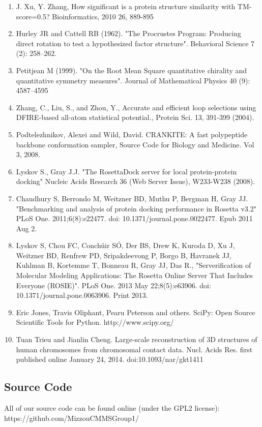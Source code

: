 \documentclass{article}
\begin{document}
\begin{enumerate}
\item J. Xu, Y. Zhang, How significant is a protein structure similarity with TM-score=0.5? Bioinformatics, 2010 26, 889-895

\item Hurley JR and Cattell RB (1962). "The Procrustes Program: Producing direct rotation to test a hypothesized factor structure". Behavioral Science 7 (2): 258–262.

\item Petitjean M (1999). "On the Root Mean Square quantitative chirality and quantitative symmetry measures". Journal of Mathematical Physics 40 (9): 4587–4595

\item Zhang, C., Liu, S., and Zhou, Y., Accurate and efficient loop selections using DFIRE-based all-atom statistical potential., Protein Sci. 13, 391-399 (2004).

\item Podtelezhnikov, Alexei and Wild, David.  CRANKITE: A fast polypeptide backbone conformation sampler, Source Code for Biology and Medicine.  Vol 3, 2008.

\item Lyskov S., Gray J.J. "The RosettaDock server for local protein-protein docking" Nucleic Acids Research 36 (Web Server Issue), W233-W238 (2008).

\item Chaudhury S, Berrondo M, Weitzner BD, Muthu P, Bergman H, Gray JJ. "Benchmarking and analysis of protein docking performance in Rosetta v3.2" PLoS One. 2011;6(8):e22477. doi: 10.1371/journal.pone.0022477. Epub 2011 Aug 2.

\item Lyskov S, Chou FC, Conchúir SÓ, Der BS, Drew K, Kuroda D, Xu J, Weitzner BD, Renfrew PD, Sripakdeevong P, Borgo B, Havranek JJ, Kuhlman B, Kortemme T, Bonneau R, Gray JJ, Das R., "Serverification of Molecular Modeling Applications: The Rosetta Online Server That Includes Everyone (ROSIE)". PLoS One. 2013 May 22;8(5):e63906. doi: 10.1371/journal.pone.0063906. Print 2013.

\item Eric Jones, Travis Oliphant, Pearu Peterson and others.  SciPy: Open Source Scientific Tools for Python.  http://www.scipy.org/

\item Tuan Trieu and Jianlin Cheng.  Large-scale reconstruction of 3D structures of human chromosomes from chromosomal contact data.  Nucl. Acids Res. first published online January 24, 2014. doi:10.1093/nar/gkt1411

\end{enumerate}

\subsection{Source Code}

All of our source code can be found online (under the GPL2 license): \\
https://github.com/MizzouCMMSGroup1/
\end{document}
